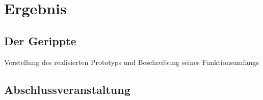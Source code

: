 \chapter{Ergebnis}

\section{Der Gerippte}
    Vorstellung des realisierten Prototyps und Beschreibung seines
    Funktionsumfangs

\section{Abschlussveranstaltung}
    